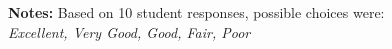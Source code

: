 \begin{boenumerate}
\begin{itemize}
\begin{figure}[h!]\centering
{}\hspace{0.75cm}
\begin{center}
\begin{minipage}[t]{0.85\columnwidth}\vspace{-0.75cm}
\item\scriptsize{\textbf{Notes:} Based on 10 student responses, possible choices were: \emph{Excellent, Very Good, Good, Fair, Poor} }
\end{minipage}
\end{center}
\end{figure}








\end{itemize}
\end{boenumerate}
